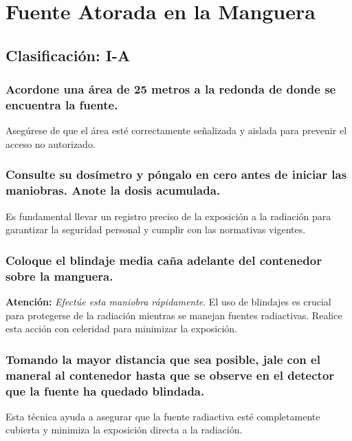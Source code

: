 \section{Fuente Atorada en la Manguera}

\subsection*{Clasificación: I-A}

\subsubsection{Acordone una área de 25 metros a la redonda de donde se encuentra la fuente.}
Asegúrese de que el área esté correctamente señalizada y aislada para prevenir el acceso no autorizado.

\subsubsection{Consulte su dosímetro y póngalo en cero antes de iniciar las maniobras. Anote la dosis acumulada.}
Es fundamental llevar un registro preciso de la exposición a la radiación para garantizar la seguridad personal y cumplir con las normativas vigentes.

\subsubsection{Coloque el blindaje media caña adelante del contenedor sobre la manguera.}
\textbf{Atención:} \textit{Efectúe esta maniobra rápidamente}.
El uso de blindajes es crucial para protegerse de la radiación mientras se manejan fuentes radiactivas. Realice esta acción con celeridad para minimizar la exposición.

\subsubsection{Tomando la mayor distancia que sea posible, jale con el maneral al contenedor hasta que se observe en el detector que la fuente ha quedado blindada.}
Esta técnica ayuda a asegurar que la fuente radiactiva esté completamente cubierta y minimiza la exposición directa a la radiación.